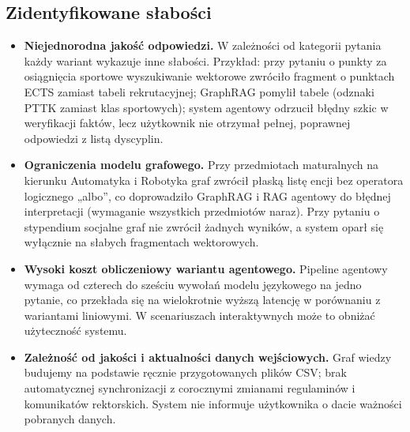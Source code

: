 \vspace{1em}

\subsection*{Zidentyfikowane słabości}

\begin{tcolorbox}[colback=red!5!white,colframe=red!50!black,title=Ograniczenia obecnej implementacji]
    \begin{itemize}[leftmargin=*, nosep]
        \item \textbf{Niejednorodna jakość odpowiedzi.}
              W zależności od kategorii pytania każdy wariant wykazuje inne słabości.
              Przykład: przy pytaniu o punkty za osiągnięcia sportowe wyszukiwanie wektorowe zwróciło fragment
              o punktach ECTS zamiast tabeli rekrutacyjnej; GraphRAG pomylił tabele (odznaki PTTK zamiast klas sportowych);
              system agentowy odrzucił błędny szkic w weryfikacji faktów, lecz użytkownik nie otrzymał pełnej,
              poprawnej odpowiedzi z listą dyscyplin.

        \item \textbf{Ograniczenia modelu grafowego.}
              Przy przedmiotach maturalnych na kierunku Automatyka i Robotyka graf zwrócił płaską listę encji
              bez operatora logicznego „albo'', co doprowadziło GraphRAG i RAG agentowy do błędnej interpretacji
              (wymaganie wszystkich przedmiotów naraz). Przy pytaniu o stypendium socjalne graf nie zwrócił
              żadnych wyników, a system oparł się wyłącznie na słabych fragmentach wektorowych.

        \item \textbf{Wysoki koszt obliczeniowy wariantu agentowego.}
              Pipeline agentowy wymaga od czterech do sześciu wywołań modelu językowego na jedno pytanie,
              co przekłada się na wielokrotnie wyższą latencję w porównaniu z wariantami liniowymi.
              W scenariuszach interaktywnych może to obniżać użyteczność systemu.

        \item \textbf{Zależność od jakości i aktualności danych wejściowych.}
              Graf wiedzy budujemy na podstawie ręcznie przygotowanych plików CSV; brak automatycznej
              synchronizacji z corocznymi zmianami regulaminów i komunikatów rektorskich.
              System nie informuje użytkownika o dacie ważności pobranych danych.


\end{itemize}
\end{tcolorbox}

